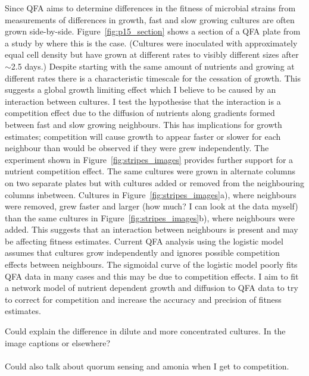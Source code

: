 Since QFA aims to determine differences in the fitness of microbial
strains from measurements of differences in growth, fast and slow
growing cultures are often grown
side-by-side. Figure~\ref{fig:p15_section} shows a section of a QFA
plate from a study by \citeauthor*{Addinall2011} where this is the
case. (Cultures were inoculated with approximately equal cell density
but have grown at different rates to visibly different sizes after
\(\sim\)2.5 days.) Despite starting with the same amount of nutrients
and growing at different rates there is a characteristic timescale for
the cessation of growth. This suggests a global growth limiting effect
which I believe to be caused by an interaction between cultures. I
test the hypothesise that the interaction is a competition effect due
to the diffusion of nutrients along gradients formed between fast and
slow growing neighbours. This has implications for growth estimates;
competition will cause growth to appear faster or slower for each
neighbour than would be observed if they were grew independently. The
experiment shown in Figure~\ref{fig:stripes_images} provides further
support for a nutrient competition effect. The same cultures were
grown in alternate columns on two separate plates but with cultures
added or removed from the neighbouring columns inbetween. Cultures in
Figure~\ref{fig:stripes_images}a), where neighbours were removed, grew
faster and larger (how much? I can look at the data myself) than the
same cultures in Figure~\ref{fig:stripes_images}b), where neighbours
were added. This suggests that an interaction between neighbours is
present and may be affecting fitness estimates. Current QFA analysis
using the logistic model assumes that cultures grow independently and
ignores possible competition effects between neighbours. The sigmoidal
curve of the logistic model poorly fits QFA data in many cases and
this may be due to competition effects. I aim to fit a network model
of nutrient dependent growth and diffusion to QFA data to try to
correct for competition and increase the accuracy and precision of
fitness estimates.

Could explain the difference in dilute and more concentrated
cultures. In the image captions or elsewhere?\\\\
Could also talk about quorum sensing and amonia when I get to
competition.


